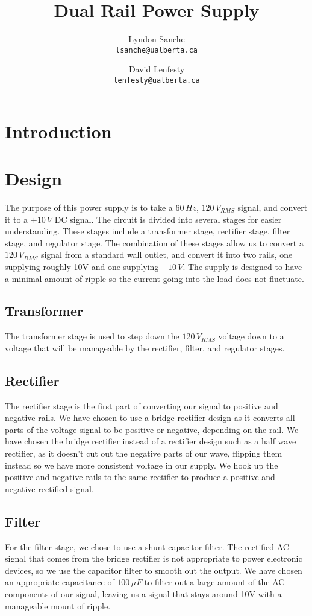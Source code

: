 \documentclass{article}
\title{Dual Rail Power Supply}
\author{
    Lyndon Sanche\\
    \texttt{lsanche@ualberta.ca}
    \and
    David Lenfesty\\
    \texttt{lenfesty@ualberta.ca}
}
\begin{document}
\maketitle
\newpage
\tableofcontents

\section{Introduction}

\section{Design}
The purpose of this power supply is to take a $60\,Hz$, $120\,V_{RMS}$ signal, and convert it to a $\pm10\,V$ DC signal. The circuit is divided into
several stages for easier understanding. These stages include a transformer stage, rectifier stage, filter stage, and regulator stage. The combination 
of these stages allow us to convert a $120\,V_{RMS}$ signal from a standard wall outlet, and convert it into two rails, one supplying roughly 10V and one supplying $-10\,V$. 
The supply is designed to have a minimal amount of ripple so the current going into the load does not fluctuate.

\subsection{Transformer}
The transformer stage is used to step down the $120\,V_{RMS}$ voltage down to a voltage that will be manageable by the rectifier, filter, and regulator stages.

\subsection{Rectifier}
The rectifier stage is the first part of converting our signal to positive and negative rails. We have chosen to use a bridge rectifier design as it converts all parts of the voltage signal 
to be positive or negative, depending on the rail. We have chosen the bridge rectifier instead of a rectifier design such as a half wave rectifier, as it doesn't cut out 
the negative parts of our wave, flipping them instead so we have more consistent voltage in our supply. We hook up the positive and negative rails to the same rectifier to produce a 
positive and negative rectified signal.

\subsection{Filter}
For the filter stage, we chose to use a shunt capacitor filter. The rectified AC signal that comes from the bridge rectifier is not appropriate to power electronic devices, so 
we use the capacitor filter to smooth out the output. We have chosen an appropriate capacitance of $100\,\mu F$ to filter out a large amount of the AC components of our signal, leaving us a 
signal that stays around 10V with a manageable mount of ripple.
\end{document}
